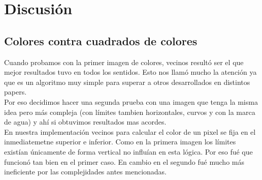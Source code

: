 \section{Discusi\'on}

\subsection{Colores contra cuadrados de colores}
Cuando probamos con la primer imagen de colores, vecinos resultó ser el que mejor resultados tuvo en todos los sentidos. Esto nos llamó mucho la atención ya que es un algoritmo muy simple para superar a otros desarrollados en distintos papers.\\
Por eso decidimos hacer una segunda prueba con una imagen que tenga la misma idea pero más compleja (con límites tambien horizontales, curvos y con la marca de agua) y ahí si obtuvimos resultados mas acordes.\\
En nuestra implementación vecinos para calcular el color de un pixel se fija en el inmediatemetne superior e inferior. Como en la primera imagen los límites existían únicamente de forma vertical no influían en esta lógica. Por eso fué que funcionó tan bien en el primer caso. En cambio en el segundo fué mucho más ineficiente por las complejidades antes mencionadas.
